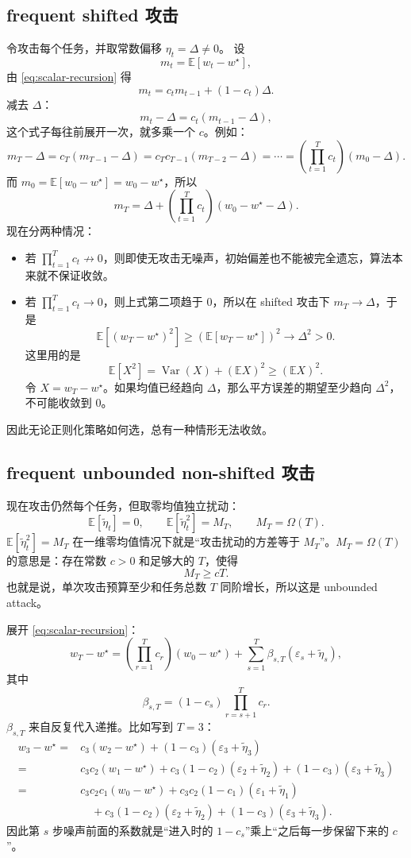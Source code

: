 \documentclass[UTF8,fontset=none,11pt]{ctexart}
\theoremstyle{cnstyle}
\newcommand{\E}{\mathbb{E}}
\begin{document}
\subsection{frequent shifted 攻击}

令攻击每个任务，并取常数偏移 \(\eta_t=\Delta\neq 0\)。
设
\[
  m_t=\E[w_t-w^\star],
\]
由 \eqref{eq:scalar-recursion} 得
\[
  m_t=c_tm_{t-1}+(1-c_t)\Delta .
\]
减去 \(\Delta\)：
\[
  m_t-\Delta=c_t(m_{t-1}-\Delta),
\]
这个式子每往前展开一次，就多乘一个 \(c\)。例如：
\[
  m_T-\Delta
  =
  c_T(m_{T-1}-\Delta)
  =
  c_Tc_{T-1}(m_{T-2}-\Delta)
  =
  \cdots
  =
  \left(\prod_{t=1}^Tc_t\right)(m_0-\Delta).
\]
而 \(m_0=\E[w_0-w^\star]=w_0-w^\star\)，所以
\[
  m_T=\Delta+\left(\prod_{t=1}^Tc_t\right)(w_0-w^\star-\Delta).
\]
现在分两种情况：
\begin{itemize}
  \item 若 \(\prod_{t=1}^Tc_t\not\to0\)，则即使无攻击无噪声，初始偏差也不能被完全遗忘，算法本来就不保证收敛。
  \item 若 \(\prod_{t=1}^Tc_t\to0\)，则上式第二项趋于 0，所以在 shifted 攻击下 \(m_T\to\Delta\)，于是
  \[
    \E[(w_T-w^\star)^2]\ge (\E[w_T-w^\star])^2\to\Delta^2>0 .
  \]
  这里用的是
  \[
    \E[X^2]=\operatorname{Var}(X)+(\E X)^2\ge(\E X)^2.
  \]
  令 \(X=w_T-w^\star\)。如果均值已经趋向 \(\Delta\)，那么平方误差的期望至少趋向 \(\Delta^2\)，不可能收敛到 0。
\end{itemize}
因此无论正则化策略如何选，总有一种情形无法收敛。

\subsection{frequent unbounded non-shifted 攻击}

现在攻击仍然每个任务，但取零均值独立扰动：
\[
  \E[\tilde\eta_t]=0,\qquad
  \E[\tilde\eta_t^2]=M_T,\qquad
  M_T=\Omega(T).
\]
\(\E[\tilde\eta_t^2]=M_T\) 在一维零均值情况下就是“攻击扰动的方差等于 \(M_T\)”。\(M_T=\Omega(T)\) 的意思是：存在常数 \(c>0\) 和足够大的 \(T\)，使得
\[
  M_T\ge cT.
\]
也就是说，单次攻击预算至少和任务总数 \(T\) 同阶增长，所以这是 unbounded attack。

展开 \eqref{eq:scalar-recursion}：
\[
  w_T-w^\star
  =
  \left(\prod_{r=1}^Tc_r\right)(w_0-w^\star)
  +
  \sum_{s=1}^T
  \beta_{s,T}(\varepsilon_s+\tilde\eta_s),
\]
其中
\[
  \beta_{s,T}=(1-c_s)\prod_{r=s+1}^Tc_r .
\]
\(\beta_{s,T}\) 来自反复代入递推。比如写到 \(T=3\)：
\begin{align*}
  w_3-w^\star
  =&c_3(w_2-w^\star)+(1-c_3)(\varepsilon_3+\tilde\eta_3)\\
  =&c_3c_2(w_1-w^\star)
    +c_3(1-c_2)(\varepsilon_2+\tilde\eta_2)
    +(1-c_3)(\varepsilon_3+\tilde\eta_3)\\
  =&c_3c_2c_1(w_0-w^\star)
    +c_3c_2(1-c_1)(\varepsilon_1+\tilde\eta_1)\\
  &\quad
    +c_3(1-c_2)(\varepsilon_2+\tilde\eta_2)
    +(1-c_3)(\varepsilon_3+\tilde\eta_3).
\end{align*}
因此第 \(s\) 步噪声前面的系数就是“进入时的 \(1-c_s\)”乘上“之后每一步保留下来的 \(c\)”。
\end{document}
